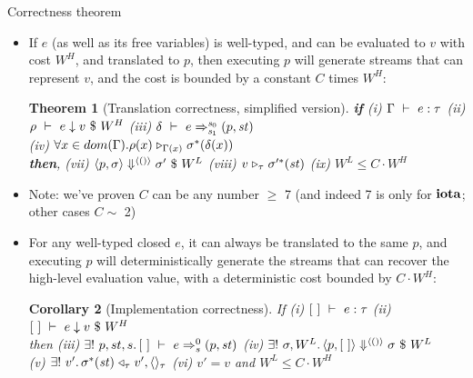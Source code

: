 \documentclass{beamer}
\newtheorem{thm}{Theorem}
\newtheorem{cor}[thm]{Corollary}
\begin{document}
\begin{frame}[shrink=20]{Correctness theorem}
\begin{itemize}
	\item If $e$ (as well as its free variables) is well-typed, and can be evaluated to $v$ with cost $W^H$, and translated to $p$,
	then executing $p$ will generate streams that can represent $v$, and the cost is bounded by a constant $C$ times $W^H$: 
	
\begin{thm}[Translation correctness, simplified version]
	\small 
	\textbf{if}
    (i) $\Gamma \ \vdash\  e : \tau$ \quad (ii) $\rho \ \vdash\  e \downarrow v \ \$ \ W^H$ \quad
	(iii) $\delta \ \vdash\  e \Rightarrow^{\mathit{s}_0}_{\mathit{s}_1} (p,\mathit{st})$ \\ 
	(iv) $\forall x \in dom(\Gamma). \rho(x) \mathrel{\triangleright_{\Gamma(x)}} \sigma^*(\delta(x))$ \\
	\textbf{then},
	(vii) $\left\langle p,\sigma \right\rangle \Downarrow^{\langle () \rangle} \sigma' \ \$ \ W^L$ \quad
    (viii)  $v \mathrel{\triangleright_{\tau}} \sigma'^*(\mathit{st})$ \quad
	(ix) $W^L \le C \cdot W^H$  \\
	\end{thm}
	\item Note: we've proven $C$ can be any number $\ge$ 7 (and indeed 7 is only for $\mathbf{iota}$; other cases $C \sim$ 2) 

	

	\item For any well-typed closed $e$, it can always be translated to the same $p$, and executing $p$ will deterministically generate the streams that can recover the high-level evaluation value, with a deterministic cost bounded by $C \cdot W^H$:
\begin{cor}[Implementation correctness]
	If	(i) $[\ ] \ \vdash\  e : \tau$ \quad 
		(ii) $[\ ] \ \vdash\  e \downarrow v \ \$ \ W^H$ \\
	then 
		(iii) $\exists! \ p,st,s \mathpunct{.} [\ ] \ \vdash\  e \Rightarrow^{0}_{s} (p,\mathit{st})$ \quad 
		(iv) $\exists! \ \sgm, {W^L} \mathpunct{.}  \seval{p}{[\ ]}{\vunit}{\sgm}{W^L} $  \\
		(v) $\exists! \ v'\mathpunct{.} \sigma^*(\mathit{st}) \mathrel{\triangleleft_{\tau}} v',\langle \rangle_{\tau} $  \quad 
		(vi) $v' = v$ and $ W^L \le C \cdot W^H$ 
\end{cor}

\end{itemize}
\end{frame}
\end{document}
